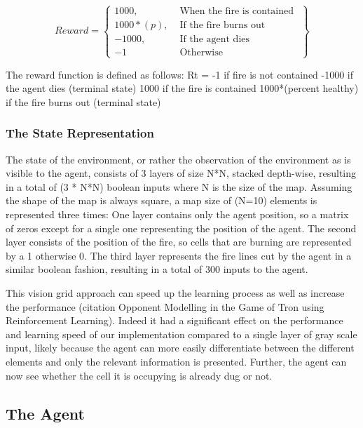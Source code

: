 \[
Reward = \left\{\begin{array}{lr}
    1000, & \text{ When the fire is contained }\\
    1000 * (p), & \text{ If the fire burns out }\\
    -1000, & \text{ If the agent dies }\\
    -1 & \text{ Otherwise }

    \end{array}\right\}
\]

The reward function is defined as follows:
Rt = -1 if fire is not contained
    -1000 if the agent dies (terminal state)
    1000 if the fire is contained
    1000*(percent healthy) if the fire burns out (terminal state)

\subsubsection{The State Representation}\label{sec:state_rep}
The state of the environment, or rather the observation of the environment as is visible to the agent, consists of 3 layers of size N*N, stacked depth-wise, resulting in a total of (3 * N*N) boolean inputs where N is the size of the map. Assuming the shape of the map is always square, a map size of (N=10) elements is represented three times: One layer contains only the agent position, so a matrix of zeros except for a single one representing the position of the agent. The second layer consists of the position of the fire, so cells that are burning are represented by a 1 otherwise 0. The third layer represents the fire lines cut by the agent in a similar boolean fashion, resulting in a total of 300 inputs to the agent.

This vision grid approach can speed up the learning process as well as increase the performance (citation Opponent Modelling in the Game of Tron using Reinforcement Learning). Indeed it had a significant effect on the performance and learning speed of our implementation compared to a single layer of gray scale input, likely because the agent can more easily differentiate between the different elements and only the relevant information is presented. Further, the agent can now see whether the cell it is occupying is already dug or not.





\subsection{The Agent}\label{sec:agent}


